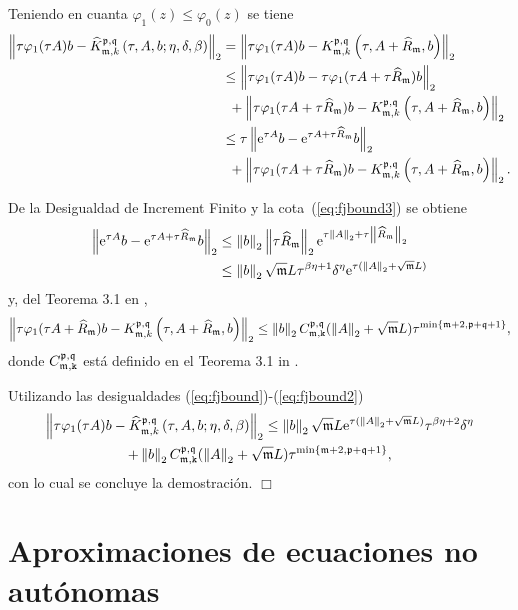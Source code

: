 Teniendo en cuanta $\varphi_1(z) \leq \varphi_0(z)$ se tiene
\begin{align}
	\left\lVert \tau \varphi_1(\tau A)b -\widehat{K}_{\mathfrak{m},k}^{\mathfrak{p},\mathfrak{q}}\left( \tau, A , b; \eta, \delta, \beta \right) \right\rVert_2 & = \left\lVert \tau \varphi_1(\tau A)b -K_{\mathfrak{m},k}^{\mathfrak{p},\mathfrak{q}}\left( \tau, A+\widehat{R}_{\mathfrak{m}} , b \right) \right\rVert_2 \nonumber \\
	& \leq \left\lVert \tau \varphi_1(\tau A)b - \tau \varphi_1(\tau A + \tau \widehat{R}_{\mathfrak{m}})b \right\rVert_2 \nonumber \\
	& \enspace + \left\lVert \tau \varphi_1(\tau A + \tau \widehat{R}_{\mathfrak{m}})b-K_{\mathfrak{m},k}^{\mathfrak{p},\mathfrak{q}}\left( \tau, A+\widehat{R}_{\mathfrak{m}} , b \right) \right\rVert_2 \nonumber\\
	& \leq \tau \left\lVert \mathrm{e}^{\tau A}b - \mathrm{e}^{\tau A + \tau \widehat{R}_{\mathfrak{m}}}b \right\rVert_2 \nonumber \\
	& \enspace + \left\lVert \tau \varphi_1(\tau A + \tau \widehat{R}_{\mathfrak{m}})b-K_{\mathfrak{m},k}^{\mathfrak{p},\mathfrak{q}}\left( \tau, A+\widehat{R}_{\mathfrak{m}} , b \right) \right\rVert_2. \label{eq:fjbound}
\end{align}

De la Desigualdad de Increment Finito y la cota~(\ref{eq:fjbound3}) se obtiene
\begin{align}
	\left\lVert \mathrm{e}^{\tau A}b - \mathrm{e}^{\tau A + \tau \widehat{R}_{\mathfrak{m}}}b \right\rVert_2&\leq \left\lVert b \right\rVert_2 \left\lVert \tau \widehat{R}_{\mathfrak{m}} \right\rVert_2\mathrm{e}^{\tau\left\lVert A \right\rVert_2+\tau\left\lVert \widehat{R}_{\mathfrak{m}} \right\rVert_2} \\ &\leq \left\lVert b \right\rVert_2   \sqrt{\mathfrak{m}}L \tau^{\beta\eta+1}\delta^\eta\mathrm{e}^{\tau(\left\lVert A \right\rVert_2+\sqrt{\mathfrak{m}}L)} \nonumber\label{eq:fjbound1}
\end{align}
y, del Teorema 3.1 en \cite{naranjo2021locally}, 
\vspace{-0.25cm}
\begin{equation}
	\left\lVert \tau \varphi_1(\tau A+\widehat{R}_{\mathfrak{m}})b-K_{\mathfrak{m},k}^{\mathfrak{p},\mathfrak{q}}\left( \tau, A+\widehat{R}_{\mathfrak{m}} , b \right) \right\rVert_2  \leq \left\lVert b \right\rVert_2C_{\mathfrak{m},\mathtt{k}}^{\mathfrak{p},\mathfrak{q}}(\left\lVert A \right\rVert_2+\sqrt{\mathfrak{m}}L)\tau^{\min\{\mathfrak{m}+2,\mathfrak{p}+\mathfrak{q}+1\}}, \label{eq:fjbound2}
\end{equation}
donde $C_{\mathfrak{m},\mathtt{k}}^{\mathfrak{p},\mathfrak{q}}$ está definido en el Teorema 3.1 in \cite{naranjo2021locally}.

Utilizando las desigualdades (\ref{eq:fjbound})-(\ref{eq:fjbound2})
\vspace{-0.25cm}
\begin{multline*}
	\left\lVert \tau \varphi_1(\tau A)b -\widehat{K}_{\mathfrak{m},k}^{\mathfrak{p},\mathfrak{q}}\left( \tau, A , b; \eta, \delta, \beta \right) \right\rVert_2 \leq 
	\left\lVert b \right\rVert_2 \sqrt{\mathfrak{m}}L \mathrm{e}^{\tau(\left\lVert A \right\rVert_2+\sqrt{\mathfrak{m}}L)} \tau^{\beta\eta+2}\delta^\eta \\ + \left\lVert b \right\rVert_2C_{\mathfrak{m},\mathtt{k}}^{\mathfrak{p},\mathfrak{q}}(\left\lVert A \right\rVert_2+\sqrt{\mathfrak{m}}L)\tau^{\min\{\mathfrak{m}+2,\mathfrak{p}+\mathfrak{q}+1\}} ,
\end{multline*}
con lo cual se concluye la demostración. $\Box$\\


\section{Aproximaciones de ecuaciones no autónomas}
